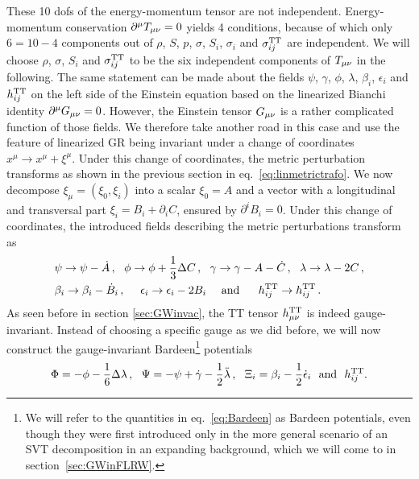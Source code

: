 These 10 \acp{dof} of the energy-momentum tensor are not independent. Energy-momentum conservation $\partial^\mu T_{{\mu \nu}} = 0$ yields 4 conditions, because of which  only $6 = 10 - 4$ components out of $\rho$, $S$, $p$, $\sigma$, $S_i$, $\sigma_i$ and $\sigma_{ij}^{\text{TT}}$ are independent. We will choose $\rho$, $\sigma$, $S_i$ and $\sigma_{ij}^{\text{TT}}$  to be the six independent components of $T_{{\mu \nu}}$ in the following. The same statement can be made about the fields $\psi$, $\gamma$, $\phi$, $\lambda$, $\beta_i$, $\epsilon_i$ and $h_{ij}^{\text{TT}}$ on the left side of the Einstein equation based on the linearized Bianchi identity $\partial^\mu G_{{\mu \nu}} = 0$. However, the Einstein tensor $G_{{\mu \nu}}$ is a rather complicated function of those fields. We therefore take another road in this case and use the feature of linearized \ac{GR} being invariant under a change of coordinates $x^\mu \rightarrow x^\mu + \xi^\mu$. Under this change of coordinates, the metric perturbation transforms as shown in the previous section in eq.~\eqref{eq:linmetrictrafo}. We now decompose $\xi_\mu= (\xi_0, \xi_i)$ into a scalar $\xi_0 = A$ and a vector with a longitudinal and transversal part $\xi_i = B_i + \partial_i C$, ensured by $\partial^i B_i = 0$. Under this change of coordinates, the introduced fields describing the metric perturbations transform as
\begin{align}
	&\psi \rightarrow \psi - \dot{A} \, , ~~ \phi \rightarrow \phi + \frac{1}{3} \Delta C  \, , ~~ \gamma \rightarrow \gamma - A - \dot{C} \, , ~~ \lambda \rightarrow \lambda - 2C  \, , \nonumber \\
	&\beta_i \rightarrow \beta_i - \dot{B}_i \, , ~~~~ \epsilon_i \rightarrow \epsilon_i - 2 B_i ~~~~ \text{and} ~~~~~ h_{ij}^{\text{TT}} \rightarrow h_{ij}^{\text{TT}} \, . \label{eq:Bardeen}
\end{align}
As seen before in section \ref{sec:GWinvac}, the \ac{TT} tensor $h_{{\mu \nu}}^{\text{TT}}$ is indeed gauge-invariant. Instead of choosing a specific gauge as we did before, we will now construct the gauge-invariant Bardeen\footnote{We will refer to the quantities in eq.~\eqref{eq:Bardeen} as Bardeen potentials, even though they were first introduced only in the more general scenario of an \ac{SVT} decomposition in an expanding background, which we will come to in section~\ref{sec:GWinFLRW}.}  potentials
\begin{align}
	\Phi = - \phi - \frac{1}{6} \Delta \lambda \, , ~~ \Psi = - \psi + \dot{\gamma} - \frac{1}{2} \ddot{\lambda} \,, ~~ \Xi_i = \beta_i - \frac{1}{2} \dot{\epsilon}_i ~~ \text{and} ~~ h_{ij}^{\text{TT}} . \label{eq:BardeenPot}
\end{align}

